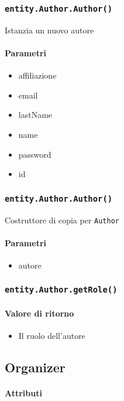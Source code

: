 \subsubsection{\texttt{entity.Author.Author()}}
Istanzia un nuovo autore
\paragraph{Parametri}
\begin{itemize}
\item affiliazione
\item email
\item lastName
\item name
\item password
\item id
\end{itemize}

\subsubsection{\texttt{entity.Author.Author()}}
Costruttore di copia per \texttt{Author}
\paragraph{Parametri}
\begin{itemize}
\item autore
\end{itemize}

\subsubsection{\texttt{entity.Author.getRole()}}
\paragraph{Valore di ritorno}
\begin{itemize}
\item Il ruolo dell'autore
\end{itemize}

\subsection{Organizer}
\paragraph{Attributi}
\begin{description}
\item
\end{description}

